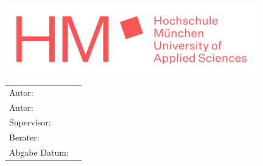 \begin{titlepage}
	\centering
	
	\includegraphics[height=30mm]{image/HM/logo_text.png}
	
	\doublespacing
	{\huge\MakeUppercase{\getFaculty{}}}
	
	\singlespacing
	\vspace{5mm}
	{\large\MakeUppercase{\getUniversity{}}}
	
	\vspace{20mm}
	{\Large \getDoctype{}}
	
	\vspace{15mm}
	{\huge\bfseries \getTitle{}}
	
	\vspace{15mm}
	{\huge\bfseries \getTitleDesc{}}
	
	\vfill{}
	\begin{tabular}{l l} %
		Autor:           & \getAuthorA \\
		Autor:           & \getAuthorA \\
		Supervisor:      & \getSupervisor{} \\
		Berater:         & \getAdvisor{} \\
		Abgabe Datum:    & \getSubmissionDate{} \\
	\end{tabular}
	
\end{titlepage}
